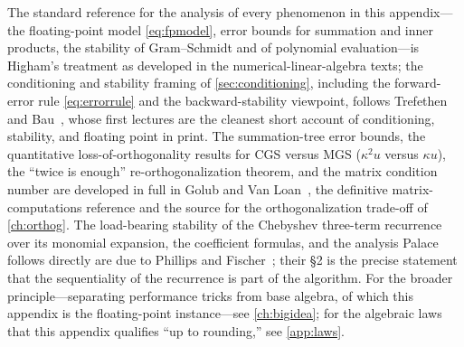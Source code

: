 \furtherreading

The standard reference for the analysis of every phenomenon in this appendix---the
floating-point model \eqref{eq:fpmodel}, error bounds for summation and inner
products, the stability of Gram--Schmidt and of polynomial evaluation---is Higham's
treatment as developed in the numerical-linear-algebra texts; the conditioning and
stability framing of \cref{sec:conditioning}, including the forward-error rule
\eqref{eq:errorrule} and the backward-stability viewpoint, follows
Trefethen and Bau~\citep{trefethenbau1997}, whose first lectures are the cleanest
short account of conditioning, stability, and floating point in print. The
summation-tree error bounds, the quantitative loss-of-orthogonality results for CGS
versus MGS ($\kappa^2 u$ versus $\kappa u$), the ``twice is enough''
re-orthogonalization theorem, and the matrix condition number are developed in full
in Golub and Van Loan~\citep{golubvanloan2013}, the definitive matrix-computations
reference and the source for the orthogonalization trade-off of \cref{ch:orthog}.
The load-bearing stability of the Chebyshev three-term recurrence over its monomial
expansion, the coefficient formulas, and the analysis Palace follows directly are due
to Phillips and Fischer~\citep{phillipsfischer2022}; their \S2 is the precise
statement that the sequentiality of the recurrence is part of the algorithm. For the
broader principle---separating performance tricks from base algebra, of which this
appendix is the floating-point instance---see \cref{ch:bigidea}; for the algebraic
laws that this appendix qualifies ``up to rounding,'' see \cref{app:laws}.
